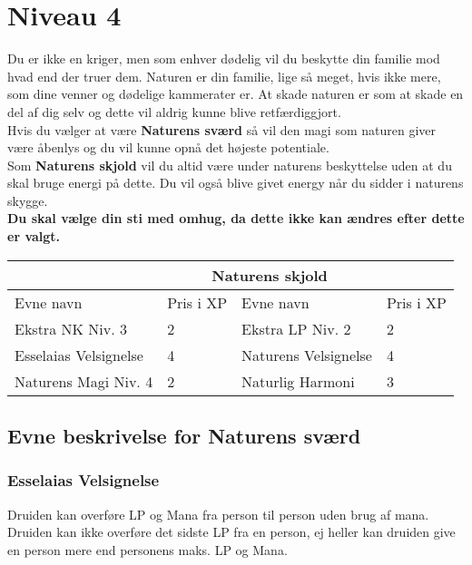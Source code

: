 \chapter*{Niveau 4}
Du er ikke en kriger, men som enhver dødelig vil du beskytte din familie mod hvad end der truer dem. Naturen er din familie, lige så meget, hvis ikke mere, som dine venner og dødelige kammerater er. At skade naturen er som at skade en del af dig selv og dette vil aldrig kunne blive retfærdiggjort.\\
Hvis du vælger at være \textbf{Naturens sværd} så vil den magi som naturen giver være åbenlys og du vil kunne opnå det højeste potentiale.\\
Som \textbf{Naturens skjold} vil du altid være under naturens beskyttelse uden at du skal bruge energi på dette. Du vil også blive givet energy når du sidder i naturens skygge.\\

\textbf{Du skal vælge din sti med omhug, da dette ikke kan ændres efter dette er valgt.}\\

\begin{tabular}{|p{}|p{}|p{}|p{}|}
\hline
\rowcolor{cerulean!80}
 \multicolumn{2}{|c|}{ Naturens sværd } & \multicolumn{2}{|c|}{ Naturens skjold }\\
\hline
\rowcolor{cerulean!40}
    Evne navn & Pris i XP & Evne navn & Pris i XP\\ \hline
    Ekstra NK Niv. 3 & 2& Ekstra LP Niv. 2 &2\\\hline
Esselaias Velsignelse & 4& Naturens Velsignelse &4\\\hline
Naturens Magi Niv. 4 & 2& Naturlig Harmoni &3\\\hline
\end{tabular}

\section*{Evne beskrivelse for Naturens sværd}



\subsection*{Esselaias Velsignelse}
Druiden kan overføre LP og Mana fra person til person uden brug af mana.
Druiden kan ikke overføre det sidste LP fra en person, ej heller kan druiden give
en person mere end personens maks. LP og Mana.


